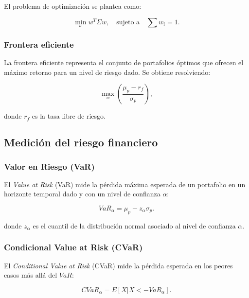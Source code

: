 \begin{itemize}
		El problema de optimización se plantea como:
		
		\begin{equation}
			\min_w w^T \Sigma w, \quad \text{sujeto a} \quad \sum w_i = 1.
		\end{equation}
		
		\subsubsection{Frontera eficiente}
		
		La frontera eficiente representa el conjunto de portafolios óptimos que ofrecen el máximo retorno para un nivel de riesgo dado. Se obtiene resolviendo:
		
		\begin{equation}
			\max_w \left( \frac{\mu_p - r_f}{\sigma_p} \right),
		\end{equation}
		
		donde \( r_f \) es la tasa libre de riesgo.
		
		\subsection{Medición del riesgo financiero}
		
		\subsubsection{Valor en Riesgo (VaR)}
		
		El \textit{Value at Risk} (VaR) mide la pérdida máxima esperada de un portafolio en un horizonte temporal dado y con un nivel de confianza \( \alpha \):
		
		\begin{equation}
			VaR_{\alpha} = \mu_p - z_{\alpha} \sigma_p.
		\end{equation}
		
		donde \( z_{\alpha} \) es el cuantil de la distribución normal asociado al nivel de confianza \( \alpha \).
		
		\subsubsection{Condicional Value at Risk (CVaR)}
		
		El \textit{Conditional Value at Risk} (CVaR) mide la pérdida esperada en los peores casos más allá del \( VaR \):
		
		\begin{equation}
			CVaR_{\alpha} = E[X | X < -VaR_{\alpha}].
		\end{equation}
		

\end{itemize}
